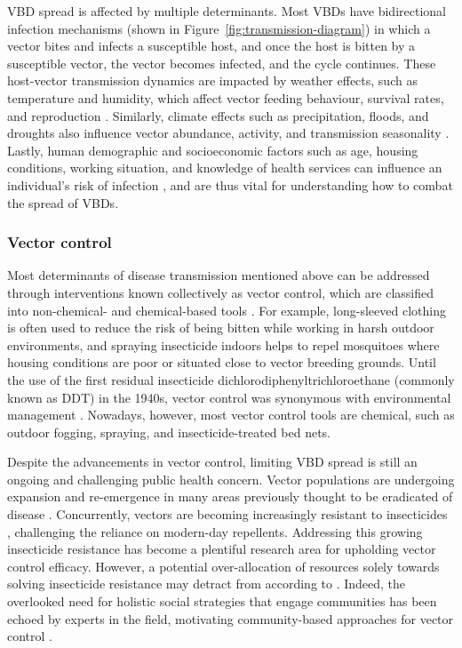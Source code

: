 VBD spread is affected by multiple determinants. Most VBDs have bidirectional infection mechanisms (shown in Figure~\ref{fig:transmission-diagram}) in which a vector bites and infects a susceptible host, and once the host is bitten by a susceptible vector, the vector becomes infected, and the cycle continues. These host-vector transmission dynamics are impacted by weather effects, such as temperature and humidity, which affect vector feeding behaviour, survival rates, and reproduction \cite{campbell-lendrum_climate_2015}. Similarly, climate effects such as precipitation, floods, and droughts also influence vector abundance, activity, and transmission seasonality \cite{woolhouse_early_2001}. Lastly, human demographic and socioeconomic factors such as age, housing conditions, working situation, and knowledge of health services can influence an individual's risk of infection \cite{chala_emerging_2021, hasyim_social_2019}, and are thus vital for understanding how to combat the spread of VBDs.

\subsubsection{Vector control}\label{sec:lit-review-vec-control}

Most determinants of disease transmission mentioned above can be addressed through interventions known collectively as vector control, which are classified into non-chemical- and chemical-based tools \cite{wilson_importance_2020}. For example, long-sleeved clothing is often used to reduce the risk of being bitten while working in harsh outdoor environments, and spraying insecticide indoors helps to repel mosquitoes where housing conditions are poor or situated close to vector breeding grounds. Until the use of the first residual insecticide dichlorodiphenyltrichloroethane (commonly known as DDT) in the 1940s, vector control was synonymous with environmental management \cite{wilson_importance_2020}. Nowadays, however, most vector control tools are chemical, such as outdoor fogging, spraying, and insecticide-treated bed nets.

Despite the advancements in vector control, limiting VBD spread is still an ongoing and challenging public health concern. Vector populations are undergoing expansion and re-emergence in many areas previously thought to be eradicated of disease \cite{atkinson_global_2010}. Concurrently, vectors are becoming increasingly resistant to insecticides \cite{degroote_interventions_2018, hemingway_averting_2016}, challenging the reliance on modern-day repellents. Addressing this growing insecticide resistance has become a plentiful research area for upholding vector control efficacy. However, a potential over-allocation of resources solely towards solving insecticide resistance may detract from  according to \citet{okumu_what_2022}. Indeed, the overlooked need for holistic social strategies that engage communities has been echoed by experts in the field, motivating community-based approaches for vector control \cite{bardosh_addressing_2017}.

